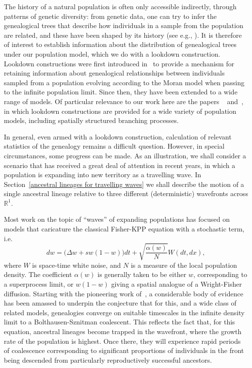 \documentclass[EJP]{ejpecp} %
\newcommand{\IR}{\mathbb R}
\newcommand{\citep}[1]{\cite{#1}}
\begin{document}
The history of a natural population is often only accessible indirectly, 
through patterns of genetic diversity:
from genetic data, one can try to infer the genealogical trees that describe how
individuals in a sample from the population are related, and these have been shaped 
by its history (see e.g., \citep{neigel1993application,kelleher2019inferring}).
It is therefore of interest to establish information about the distribution of genealogical trees 
under our population model, which we do with a lookdown construction. 
Lookdown constructions were first introduced in~\cite{donnelly/kurtz:1996} to provide 
a mechanism for retaining information about genealogical relationships between individuals
sampled from a population evolving according to the Moran model when passing to the 
infinite population limit.
Since then, they have been extended to a wide range of models. Of particular
relevance to our work here are the papers ~\cite{kurtz/rodrigues:2011} 
and~\cite{etheridge/kurtz:2019}, in which
lookdown constructions are provided for a wide variety of population models, including
spatially structured branching processes.

In general, even armed with a lookdown construction, calculation of relevant statistics 
of the genealogy remains a difficult question. 
However, in special
circumstances, some progress can be made. As an illustration, 
we shall consider a scenario that
has received a great deal of attention in recent years, in which 
a population is expanding into new territory as a travelling wave. 
In Section~\ref{ancestral lineages for travelling waves}
we shall describe the motion of a single ancestral lineage relative to
three different (deterministic) wavefronts across $\IR^1$.

Most work on the topic of ``waves'' of expanding populations
has focused on models that caricature the classical Fisher-KPP equation with a 
stochastic term, i.e.
$$dw=\big(\Delta w +sw(1-w)\big)dt +\sqrt{\frac{\alpha(w)}{N}}W(dt,dx),$$
where $W$ is space-time white noise, and $N$ is a measure of the 
local population density. The coefficient
$\alpha(w)$ is generally taken to be either
$w$, corresponding to a superprocess limit, or $w(1-w)$ giving a 
spatial analogue of a Wright-Fisher diffusion. 
Starting with the pioneering work of~\cite{brunet/derrida/mueller/munier:2006},
a considerable body of evidence has been amassed to underpin the
conjecture that for this, and a wide class of related models, 
genealogies converge on suitable timescales in the infinite density limit
to a Bolthausen-Sznitman coalescent. %
This reflects the fact that, for this equation, 
ancestral lineages become trapped in 
the wavefront, where the growth rate of the population is highest. 
Once there, they will experience 
rapid periods of coalescence 
corresponding to significant proportions of individuals in the front being 
descended from particularly reproductively successful ancestors. 
\end{document}
